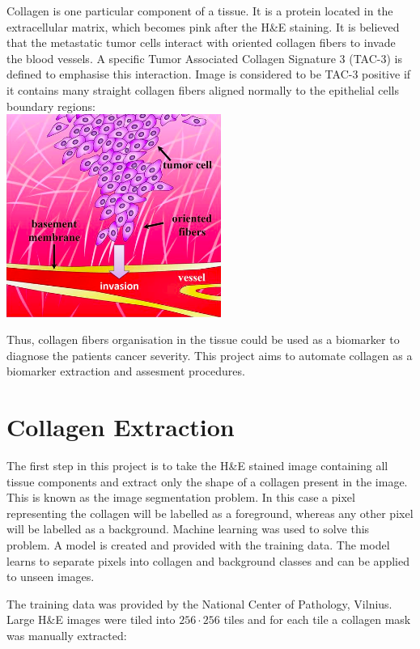 \documentclass{article}
\begin{document}
Collagen is one particular component of a tissue. It is a protein located
in the extracellular matrix, which becomes pink after the H\&E staining.
It is believed that the metastatic tumor cells interact with oriented
collagen fibers to invade the blood vessels. A specific Tumor Associated
Collagen Signature 3 (TAC-3) is defined to emphasise this interaction. Image
is considered to be TAC-3 positive if it contains many straight collagen
fibers aligned normally to the epithelial cells boundary regions: \\

\includegraphics[width=7cm]{images/tac3.png}

Thus, collagen fibers organisation in the tissue could be used as a biomarker
to diagnose the patients cancer severity. This project aims to automate
collagen as a biomarker extraction and assesment procedures.

\section{Collagen Extraction}

The first step in this project is to take the H\&E stained image containing
all tissue components and extract only the shape of a collagen present
in the image. This is known as the image segmentation problem. In this case
a pixel representing the collagen will be labelled as a foreground, whereas any
other pixel will be labelled as a background. Machine learning was used
to solve this problem. A model is created and provided with the training data.
The model learns to separate pixels into collagen and background classes
and can be applied to unseen images.

The training data was provided by the National Center of Pathology, Vilnius.
Large H\&E images were tiled into $256 \cdot 256$ tiles and for each tile
a collagen mask was manually extracted: \\
\end{document}

